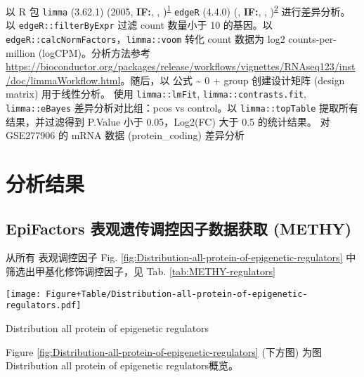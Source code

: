 \documentclass[
]{article}
\begin{document}
以 R 包 \texttt{limma} (3.62.1) (2005, \textbf{IF:}, , )\textsuperscript{\protect\hyperlink{ref-LimmaLinearMSmyth2005}{1}} \texttt{edgeR} (4.4.0) (, \textbf{IF:}, , )\textsuperscript{\protect\hyperlink{ref-EdgerDifferenChen}{2}} 进行差异分析。以 \texttt{edgeR::filterByExpr} 过滤 count 数量小于 10 的基因。以 \texttt{edgeR::calcNormFactors}，\texttt{limma::voom} 转化 count 数据为 log2 counts-per-million (logCPM)。分析方法参考 \url{https://bioconductor.org/packages/release/workflows/vignettes/RNAseq123/inst/doc/limmaWorkflow.html}。随后，以 公式 \textasciitilde{} 0 + group 创建设计矩阵 (design matrix) 用于线性分析。
使用 \texttt{limma::lmFit}, \texttt{limma::contrasts.fit}, \texttt{limma::eBayes} 差异分析对比组：pcos vs control。以 \texttt{limma::topTable} 提取所有结果，并过滤得到 P.Value 小于 0.05，\textbar Log2(FC)\textbar{} 大于 0.5 的统计结果。
对 GSE277906 的 mRNA 数据 (protein\_coding) 差异分析

\hypertarget{workflow}{%
\section{分析结果}\label{workflow}}

\hypertarget{epifactors-ux8868ux89c2ux9057ux4f20ux8c03ux63a7ux56e0ux5b50ux6570ux636eux83b7ux53d6-methy}{%
\subsection{EpiFactors 表观遗传调控因子数据获取 (METHY)}\label{epifactors-ux8868ux89c2ux9057ux4f20ux8c03ux63a7ux56e0ux5b50ux6570ux636eux83b7ux53d6-methy}}

从所有 表观调控因子 Fig. \ref{fig:Distribution-all-protein-of-epigenetic-regulators}
中筛选出甲基化修饰调控因子，见 Tab. \ref{tab:METHY-regulators}

\begin{center}\vspace{1.5cm}\end{center}
\def\@captype{figure}
\begin{center}
\texttt{[image: Figure+Table/Distribution-all-protein-of-epigenetic-regulators.pdf]}
\caption{Distribution all protein of epigenetic regulators}\label{fig:Distribution-all-protein-of-epigenetic-regulators}
\end{center}

Figure \ref{fig:Distribution-all-protein-of-epigenetic-regulators} (下方图) 为图Distribution all protein of epigenetic regulators概览。
\end{document}
